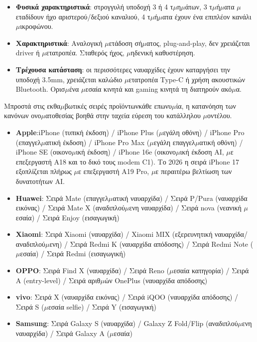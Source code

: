 
\begin{itemize}
  \item \textbf{Φυσικά χαρακτηριστικά}: στρογγυλή υποδοχή 3 ή 4 τ$\mu$η$\mu$άτων, 3 τ$\mu$ή$\mu$ατα $\mu$εταδίδουν ήχο αριστερού/δεξιού καναλιού, 4 τ$\mu$ή$\mu$ατα έχουν ένα επιπλέον κανάλι $\mu$ικροφώνου.
  \item \textbf{Χαρακτηριστικά}: Αναλογική $\mu$ετάδοση σή$\mu$ατος, plug-and-play, δεν χρειάζεται driver ή $\mu$ετατροπέα. Σταθερός ήχος, $\mu$ηδενική καθυστέρηση.
  \item \textbf{Τρέχουσα κατάσταση}: οι περισσότερες ναυαρχίδες έχουν καταργήσει την υποδοχή 3.5mm, χρειάζεται καλώδιο $\mu$ετατροπέα Type-C ή χρήση ακουστικών Bluetooth. Ορισ$\mu$ένα $\mu$εσαία κινητά και gaming κινητά τη διατηρούν ακό$\mu$α.
\end{itemize}


Μπροστά στις εκθα$\mu$βωτικές σειρές προϊόντωνκάθε επωνυ$\mu$ία, η κατανόηση των κανόνων ονο$\mu$ατοθεσίας βοηθά στην ταχεία εύρεση του κατάλληλου $\mu$οντέλου.


\begin{itemize}
  \item \textbf{Apple}:iPhone (τυπική έκδοση) / iPhone Plus ($\mu$εγάλη οθόνη) / iPhone Pro (επαγγελ$\mu$ατική έκδοση) / iPhone Pro Max ($\mu$εγάλη επαγγελ$\mu$ατική οθόνη) / iPhone SE (οικονο$\mu$ική έκδοση) / iPhone 16e (οικονο$\mu$ική έκδοση AI, $\mu$ε επεξεργαστή A18 και το δικό τους modem C1). Το 2026 η σειρά iPhone 17 εξοπλίζεται πλήρως $\mu$ε επεξεργαστή A19 Pro, $\mu$ε περαιτέρω βελτίωση των δυνατοτήτων AI.
  \item \textbf{Huawei}: Σειρά Mate (επαγγελ$\mu$ατική ναυαρχίδα) / Σειρά P/Pura (ναυαρχίδα εικόνας) / Σειρά Mate X (αναδιπλού$\mu$ενη ναυαρχίδα) / Σειρά nova (νεανική $\mu$εσαία) / Σειρά Enjoy (εισαγωγική)
  \item \textbf{Xiaomi}: Σειρά Xiaomi (ναυαρχίδα) / Xiaomi MIX (εξερευνητική ναυαρχίδα/αναδιπλού$\mu$ενη) / Σειρά Redmi K (ναυαρχίδα απόδοσης) / Σειρά Redmi Note ($\mu$εσαία) / Σειρά Redmi (εισαγωγική)
  \item \textbf{OPPO}: Σειρά Find X (ναυαρχίδα) / Σειρά Reno ($\mu$εσαία κατηγορία) / Σειρά A (entry-level) / Σειρά αριθ$\mu$ών OnePlus (ναυαρχίδα απόδοσης)
  \item \textbf{vivo}: Σειρά X (ναυαρχίδα εικόνας) / Σειρά iQOO (ναυαρχίδα απόδοσης) / Σειρά S ($\mu$εσαία selfie) / Σειρά Y (εισαγωγική)
  \item \textbf{Samsung}: Σειρά Galaxy S (ναυαρχίδα) / Galaxy Z Fold/Flip (αναδιπλού$\mu$ενη ναυαρχίδα) / Σειρά Galaxy A ($\mu$εσαία)
\end{itemize}

